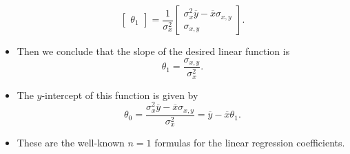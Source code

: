 \documentclass[10pt,american]{scrartcl}
\begin{document}
\begin{itemize}
\[\begin{bmatrix}
\theta_{1}
\end{bmatrix}=\frac{1}{\sigma_{x}^{2}}\begin{bmatrix}\sigma_{x}^{2}\overline{y}-\overline{x}\sigma_{x,y}\\
\sigma_{x,y}
\end{bmatrix}.
\]
\item Then we conclude that the slope of the desired linear function is
\[
\theta_{1}=\frac{\sigma_{x,y}}{\sigma_{x}^{2}}.
\]
\item The $y$-intercept of this function is given by
\[
\theta_{0}=\frac{\sigma_{x}^{2}\overline{y}-\overline{x}\sigma_{x,y}}{\sigma_{x}^{2}}=\overline{y}-\overline{x}\theta_{1}.
\]
\item These are the well-known $n=1$ formulas for the linear regression
coefficients.
\end{itemize}
\end{document}
